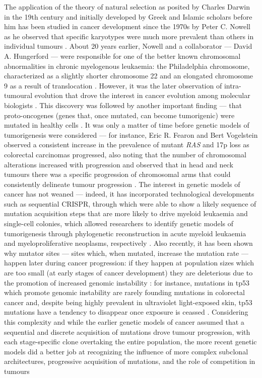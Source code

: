 The application of the theory of natural selection as posited by Charles Darwin in the 19th century \cite{Darwin1859-yw} and initially developed by Greek and Islamic scholars before him \cite{noauthor_1898-xh,Zirkle1941-bw} has been studied in cancer development since the 1970s by Peter C. Nowell as he observed that specific karyotypes were much more prevalent than others in individual tumours \cite{Nowell1976-ob}. About 20 years earlier, Nowell and a collaborator --- David A. Hungerford --- were responsible for one of the better known chromosomal abnormalities in chronic myelogenous leukaemia: the Philadelphia chromosome, characterized as a slightly shorter chromosome 22 and an elongated chromosome 9 as a result of translocation \cite{Nowell2007-ux}. However, it was the later observation of intra-tumoural evolution that drove the interest in cancer evolution among molecular biologists \cite{Cannataro2018-ye}. This discovery was followed by another important finding --- that proto-oncogenes (genes that, once mutated, can become tumorigenic) were mutated in healthy cells \cite{Stehelin1976-uu,Shih1982-gu}. It was only a matter of time before genetic models of tumorigenesis were considered --- for instance, Eric R. Fearon and Bert Vogelstein observed a consistent increase in the prevalence of mutant \textit{RAS} and 17p loss as colorectal carcinomas progressed, also noting that the number of chromosomal alterations increased with progression \cite{Fearon1990-rk} and  observed that in head and neck tumours there was a specific progression of chromosomal arms that could consistently delineate tumour progression \cite{Califano1996-kj}. The interest in genetic models of cancer has not weaned --- indeed, it has incorporated technological developments such as sequential CRISPR, through which  were able to show a likely sequence of mutation acquisition steps that are more likely to drive myeloid leukaemia \cite{Wang2021-wg} and single-cell colonies, which allowed researchers to identify genetic models of tumorigenesis through phylogenetic reconstruction in acute myeloid leukaemia and myeloproliferative neoplasms, respectively \cite{Morita2020-rq,Williams2020-ji,Van_Egeren2021-tb}. Also recently, it has been shown why mutator sites --- sites which, when mutated, increase the mutation rate --- happen later during cancer progression: if they happen at population sizes which are too small (at early stages of cancer development) they are deleterious due to the promotion of increased genomic instability \cite{Raynes2018-hg}: for instance, mutations in \ac{tp53} which promote genomic instability are rarely founding mutations in colorectal cancer \cite{Kinzler1996-mp} and, despite being highly prevalent in ultraviolet light-exposed skin, \ac{tp53} mutations have a tendency to disappear once exposure is ceassed \cite{Jonason1996-sp}. Considering this complexity and while the earlier genetic models of cancer assumed that a sequential and discrete acquisition of mutations drove tumour progression, with each stage-specific clone overtaking the entire population, the more recent genetic models did a better job at recognizing the influence of more complex subclonal architectures, progressive acquisition of mutations, and the role of competition in tumours 